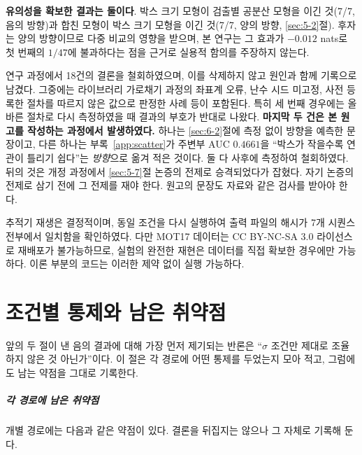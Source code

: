 \documentclass[12pt,a4paper,oneside]{report}
\begin{document}
\textbf{유의성을 확보한 결과는 둘이다}. 박스 크기 모형이 검출별 공분산 모형을 이긴 것(7/7, 음의 방향)과 합친 모형이 박스 크기 모형을 이긴 것(7/7, 양의 방향, \ref{sec:5-2}절). 후자는 양의 방향이므로 다중 비교의 영향을 받으며, 본 연구는 그 효과가 $-0.012$ nats로 첫 번째의 $1/47$에 불과하다는 점을 근거로 실용적 함의를 주장하지 않는다.

연구 과정에서 18건의 결론을 철회하였으며, 이를 삭제하지 않고 원인과 함께 기록으로 남겼다. 그중에는 라이브러리 가로채기 과정의 좌표계 오류, 난수 시드 미고정, 사전 등록한 절차를 따르지 않은 값으로 판정한 사례 등이 포함된다. 특히 세 번째 경우에는 올바른 절차로 다시 측정하였을 때 결과의 부호가 반대로 나왔다. \textbf{마지막 두 건은 본 원고를 작성하는 과정에서 발생하였다.} 하나는 \ref{sec:6-2}절에 측정 없이 방향을 예측한 문장이고, 다른 하나는 부록~\ref{app:scatter}가 주변부 AUC $0.4661$을 ``박스가 작을수록 연관이 틀리기 쉽다''는 \textit{방향}으로 옮겨 적은 것이다. 둘 다 사후에 측정하여 철회하였다. 뒤의 것은 개정 과정에서 \ref{sec:5-7}절 논증의 전제로 승격되었다가 잡혔다. 자기 논증의 전제로 삼기 전에 그 전제를 재야 한다. 원고의 문장도 자료와 같은 검사를 받아야 한다.

추적기 재생은 결정적이며, 동일 조건을 다시 실행하여 출력 파일의 해시가 7개 시퀀스 전부에서 일치함을 확인하였다. 다만 MOT17 데이터는 CC BY-NC-SA 3.0 라이선스로 재배포가 불가능하므로, 실험의 완전한 재현은 데이터를 직접 확보한 경우에만 가능하다. 이론 부분의 코드는 이러한 제약 없이 실행 가능하다.

\appendix

\chapter{조건별 통제와 남은 취약점}\label{app:controls}

앞의 두 절이 낸 음의 결과에 대해 가장 먼저 제기되는 반론은 ``$\sigma$ 조건만 제대로 조율하지 않은 것 아닌가''이다. 이 절은 각 경로에 어떤 통제를 두었는지 모아 적고, 그럼에도 남는 약점을 그대로 기록한다.

\paragraph{각 경로에 남은 취약점} 개별 경로에는 다음과 같은 약점이 있다. 결론을 뒤집지는 않으나 그 자체로 기록해 둔다.
\end{document}
